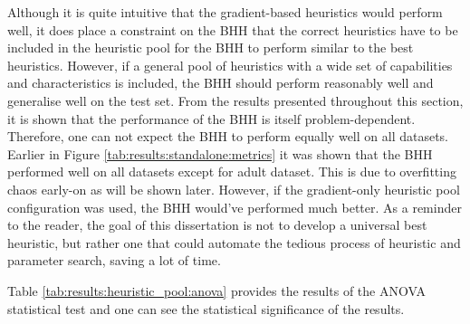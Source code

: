 Although it is quite intuitive that the gradient-based heuristics would perform well, it does place a constraint on the \Ac{BHH} that the correct heuristics have to be included in the heuristic pool for the \Ac{BHH} to perform similar to the best heuristics. However, if a general pool of heuristics with a wide set of capabilities and characteristics is included, the \Ac{BHH} should perform reasonably well and generalise well on the test set. From the results presented throughout this section, it is shown that the performance of the \Ac{BHH} is itself problem-dependent. Therefore, one can not expect the \Ac{BHH} to perform equally well on all datasets. Earlier in Figure \ref{tab:results:standalone:metrics} it was shown that the \Ac{BHH} performed well on all datasets except for adult dataset. This is due to overfitting chaos early-on as will be shown later. However, if the gradient-only heuristic pool configuration was used, the \Ac{BHH} would've performed much better. As a reminder to the reader, the goal of this dissertation is not to develop a universal best heuristic, but rather one that could automate the tedious process of heuristic and parameter search, saving a lot of time. 

Table \ref{tab:results:heuristic_pool:anova} provides the results of the ANOVA statistical test and one can see the statistical significance of the results. 

\begin{table}[htbp]
	\centering
	\caption{ANOVA - Rank - BHH Variant: Heuristic Pool}
	\label{tab:results:heuristic_pool:anova}%
	\par\bigskip
\end{table}

